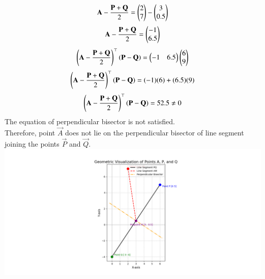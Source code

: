 \documentclass[journal]{IEEEtran}
\begin{document}
\begin{align}
    \mathbf{A}-\frac{\mathbf{P}+\mathbf{Q}}{2}=\begin{pmatrix}2\\7\end{pmatrix}-\begin{pmatrix}3\\0.5\end{pmatrix} 
\end{align}
\begin{align}
    \mathbf{A}-\frac{\mathbf{P}+\mathbf{Q}}{2}=\begin{pmatrix}-1\\6.5\end{pmatrix}   
\end{align}
\begin{align}
    \left(\mathbf{A}-\frac{\mathbf{P}+\mathbf{Q}}{2}\right)^\top\left(\mathbf{P}-\mathbf{Q}\right)=\begin{pmatrix}-1&6.5\end{pmatrix}\begin{pmatrix}6\\9\end{pmatrix}
\end{align}
\begin{align}
    \left(\mathbf{A}-\frac{\mathbf{P}+\mathbf{Q}}{2}\right)^\top\left(\mathbf{P}-\mathbf{Q}\right)=(-1)(6)+(6.5)(9)
\end{align}
\begin{align}
    \left(\mathbf{A}-\frac{\mathbf{P}+\mathbf{Q}}{2}\right)^\top\left(\mathbf{P}-\mathbf{Q}\right)=52.5\neq0
\end{align}
The equation of perpendicular bisector is not satisfied.\\
Therefore, point $\vec{A}$ does not lie on the perpendicular bisector of line segment joining the points $\vec{P}$ and $\vec {Q}$.\\

\centering
    \includegraphics[width=\columnwidth, height=0.8\textheight, keepaspectratio]{Figs/Fig1.png} 
\end{document}

